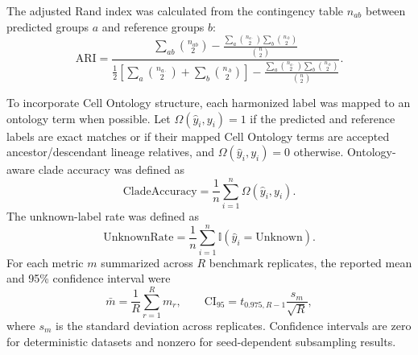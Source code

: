 \documentclass[referee,lineno,pdflatex]{sn-jnl}
\begin{document}
The adjusted Rand index was calculated from the contingency table $n_{ab}$ between predicted groups $a$ and reference groups $b$:
\begin{equation}
\mathrm{ARI}=
\frac{
\sum_{ab}\binom{n_{ab}}{2}
-\frac{\sum_a\binom{n_{a\cdot}}{2}\sum_b\binom{n_{\cdot b}}{2}}{\binom{n}{2}}
}{
\frac{1}{2}\left[\sum_a\binom{n_{a\cdot}}{2}+\sum_b\binom{n_{\cdot b}}{2}\right]
-\frac{\sum_a\binom{n_{a\cdot}}{2}\sum_b\binom{n_{\cdot b}}{2}}{\binom{n}{2}}
}.
\label{eq:ari}
\end{equation}

To incorporate Cell Ontology structure, each harmonized label was mapped to an ontology term when possible. Let $\Omega(\hat{y}_i,y_i)=1$ if the predicted and reference labels are exact matches or if their mapped Cell Ontology terms are accepted ancestor/descendant lineage relatives, and $\Omega(\hat{y}_i,y_i)=0$ otherwise. Ontology-aware clade accuracy was defined as
\begin{equation}
\mathrm{CladeAccuracy}=\frac{1}{n}\sum_{i=1}^{n}\Omega(\hat{y}_i,y_i).
\label{eq:cladeaccuracy}
\end{equation}
The unknown-label rate was defined as
\begin{equation}
\mathrm{UnknownRate}=\frac{1}{n}\sum_{i=1}^{n}\mathbb{I}(\hat{y}_i=\mathrm{Unknown}).
\label{eq:unknownrate}
\end{equation}
For each metric $m$ summarized across $R$ benchmark replicates, the reported mean and 95\% confidence interval were
\begin{equation}
\bar{m}=\frac{1}{R}\sum_{r=1}^{R}m_r,\qquad
\mathrm{CI}_{95}=t_{0.975,R-1}\frac{s_m}{\sqrt{R}},
\label{eq:ci}
\end{equation}
where $s_m$ is the standard deviation across replicates. Confidence intervals are zero for deterministic datasets and nonzero for seed-dependent subsampling results.
\end{document}
